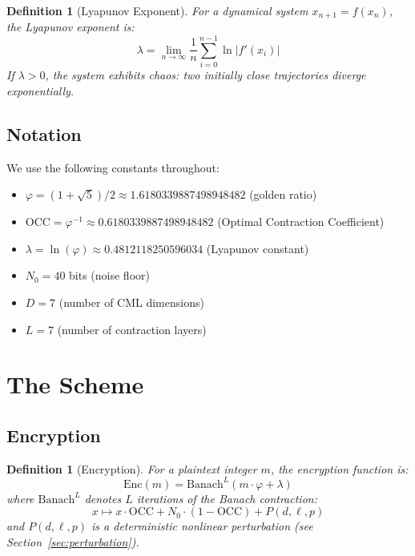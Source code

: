 \documentclass[11pt,a4paper]{article}
\newtheorem{definition}[theorem]{Definition}
\begin{document}
\begin{definition}[Lyapunov Exponent]
For a dynamical system $x_{n+1} = f(x_n)$, the Lyapunov exponent is:
\begin{equation}
    \lambda = \lim_{n \to \infty} \frac{1}{n} \sum_{i=0}^{n-1} \ln|f'(x_i)|
\end{equation}
If $\lambda > 0$, the system exhibits \textit{chaos}: two initially close trajectories diverge exponentially.
\end{definition}

\subsection{Notation}

We use the following constants throughout:
\begin{itemize}
    \item $\varphi = (1+\sqrt{5})/2 \approx 1.6180339887498948482$ (golden ratio)
    \item $\text{OCC} = \varphi^{-1} \approx 0.6180339887498948482$ (Optimal Contraction Coefficient)
    \item $\lambda = \ln(\varphi) \approx 0.4812118250596034$ (Lyapunov constant)
    \item $N_0 = 40$ bits (noise floor)
    \item $D = 7$ (number of CML dimensions)
    \item $L = 7$ (number of contraction layers)
\end{itemize}

\section{The Scheme}
\label{sec:scheme}

\subsection{Encryption}

\begin{definition}[Encryption]
For a plaintext integer $m$, the encryption function is:
\begin{equation}
    \text{Enc}(m) = \text{Banach}^L(m \cdot \varphi + \lambda)
\end{equation}
where $\text{Banach}^L$ denotes $L$ iterations of the Banach contraction:
\begin{equation}
    x \mapsto x \cdot \text{OCC} + N_0 \cdot (1 - \text{OCC}) + P(d, \ell, p)
\end{equation}
and $P(d, \ell, p)$ is a deterministic nonlinear perturbation (see Section~\ref{sec:perturbation}).
\end{definition}
\end{document}

